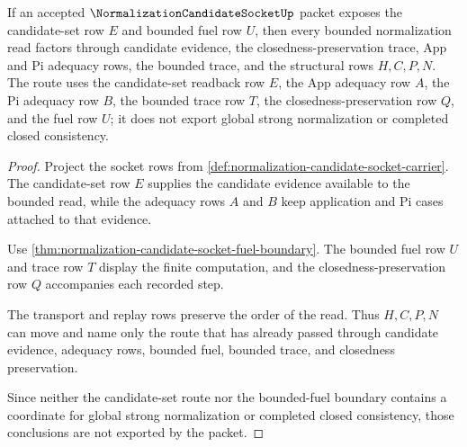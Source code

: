 \begin{theorem}
\label{thm:normalization-candidate-socket-candidate-set-fuel-route}
If an accepted $\NormalizationCandidateSocketUp$ packet exposes the candidate-set row $E$ and bounded fuel row $U$, then every bounded normalization read factors through candidate evidence, the closedness-preservation trace, App and Pi adequacy rows, the bounded trace, and the structural rows $H,C,P,N$. The route uses the candidate-set readback row $E$, the App adequacy row $A$, the Pi adequacy row $B$, the bounded trace row $T$, the closedness-preservation row $Q$, and the fuel row $U$; it does not export global strong normalization or completed closed consistency.
\end{theorem}
\begin{proof}
Project the socket rows from \autoref{def:normalization-candidate-socket-carrier}. The candidate-set row $E$ supplies the candidate evidence available to the bounded read, while the adequacy rows $A$ and $B$ keep application and Pi cases attached to that evidence.

Use \autoref{thm:normalization-candidate-socket-fuel-boundary}. The bounded fuel row $U$ and trace row $T$ display the finite computation, and the closedness-preservation row $Q$ accompanies each recorded step.

The transport and replay rows preserve the order of the read. Thus $H,C,P,N$ can move and name only the route that has already passed through candidate evidence, adequacy rows, bounded fuel, bounded trace, and closedness preservation.

Since neither the candidate-set route nor the bounded-fuel boundary contains a coordinate for global strong normalization or completed closed consistency, those conclusions are not exported by the packet.
\end{proof}

